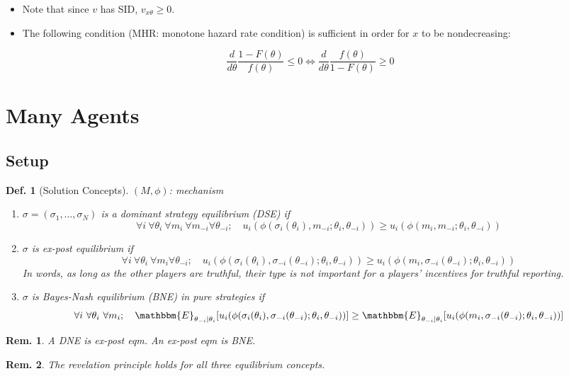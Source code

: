 \documentclass[11pt,a4paper,dvipdfmx]{article}
\theoremstyle{plain}
\newtheorem{df}{Def.}[section]
\newtheorem{rem}{Rem.}[section]
\newcommand{\equi}{\Longleftrightarrow}
\newcommand{\E}{\mathbbm{E}}
\newcommand{\1}{\mathbbm{1}}
\begin{document}
\begin{itemize}
	\item Note that since $v$ has SID, $v_{x \theta} \geq 0$.
	\item The following condition (MHR: monotone hazard rate condition) is sufficient in order for $x$ to be nondecreasing:
\end{itemize}
\[
\frac{d}{d\theta}\frac{1 - F(\theta)}{f(\theta)} \leq 0
\equi \frac{d}{d\theta}\frac{f(\theta)}{1 - F(\theta)} \geq 0
\]


\newpage
\section{Many Agents}

\subsection{Setup}
\begin{df}[Solution Concepts] $(M, \phi)$: mechanism
	\begin{enumerate}
		\item $\sigma = (\sigma_1, \dots, \sigma_N)$ is a dominant strategy equilibrium (DSE) if
		\[
		\forall i \ \forall \theta_i \ \forall m_i \ \forall m_{-i} \forall \theta_{-i}; \quad
		u_i(\phi(\sigma_i(\theta_i), m_{-i} ; \theta_i, \theta_{-i}))
		\geq u_i(\phi(m_i, m_{-i} ; \theta_i, \theta_{-i}))
		\]
		\item $\sigma$ is ex-post equilibrium if
		\[
		\forall i \ \forall \theta_i \ \forall m_i \forall \theta_{-i}; \quad
		u_i(\phi(\sigma_i(\theta_i), \sigma_{-i}(\theta_{-i}) ; \theta_i, \theta_{-i}))
		\geq u_i(\phi(m_i, \sigma_{-i}(\theta_{-i}) ; \theta_i, \theta_{-i}))
		\]
		\textnormal{In words, as long as the other players are truthful, their type is not important for a players' incentives for truthful reporting.}
		\item $\sigma$ is Bayes-Nash equilibrium (BNE) in pure strategies if
		\[
		\forall i \ \forall \theta_i \ \forall m_i; \quad
		\E_{\theta_{-i} \mid \theta_i}[
		u_i(\phi(\sigma_i(\theta_i), \sigma_{-i}(\theta_{-i}) ; \theta_i, \theta_{-i}))]
		\geq
		\E_{\theta_{-i} \mid \theta_i}[u_i(\phi(m_i, \sigma_{-i}(\theta_{-i}) ; \theta_i, \theta_{-i}))]
		\]
	\end{enumerate}
\end{df}
\begin{rem}
	A DNE is ex-post eqm. An ex-post eqm is BNE. 
\end{rem}
\begin{rem}
	The revelation principle holds for all three equilibrium concepts.
\end{rem}
\end{document}
